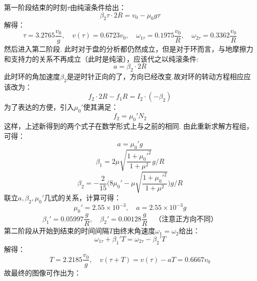 \documentclass{ctexart}
\begin{document}
第一阶段结束的时刻$\tau$由纯滚条件给出：
\begin{equation}
    \beta_2 \tau\cdot 2R=v_0-\mu_0 g\tau \tag{3.16}
\end{equation}
解得：
\begin{equation}
    \tau=3.2765\frac{v_0}{g},\quad v(\tau)=0.6723v_0,\quad \omega_{1\tau}=0.1975\frac{v_0}{R},\quad \omega_{2\tau}=0.3362\frac{v_0}{R} \tag{3.17}
\end{equation}
然后进入第二阶段. 此时对于盘的分析都仍然成立，但是对于环而言，与地摩擦力和支持力的关系不再成立（此时是纯滚），应该代之以纯滚条件:
\begin{equation}
    a=\beta_2\cdot 2R \tag{3.18}
\end{equation}
此时环的角加速度$\beta_2$是逆时针正向的了，方向已经改变.故对环的转动方程相应应该改为：
\begin{equation}
    f_2\cdot 2R-f_1R=I_2\cdot (-\beta_2) \tag{3.19}
\end{equation}
为了表达的方便，引入$\mu_0'$使其满足：
\begin{equation}
f_2=\mu_0'N_2 \tag{3.20}
\end{equation}
这样，上述新得到的两个式子在数学形式上与之前的相同. 由此重新求解方程组，可得：
\begin{equation}
    a=\mu_0' g \tag{3.21}
\end{equation}
\begin{equation}
  \beta_1=2\mu\sqrt{\frac{1+\mu_0'^2}{1+\mu^2}}g/R \tag{3.22}
  \end{equation}
  \begin{equation}
  \beta_2=-\frac{2}{15}\Big(8\mu_0'-\mu \sqrt{\frac{1+\mu_0'^2}{1+\mu^2}}\Big)g/R \tag{3.23}
  \end{equation}
联立$a,\beta_2,\mu_0'$几式的关系，计算可得：
\begin{equation}
    \mu_0'=2.55\times 10^{-3},\quad a=2.55\times 10^{-3}g \tag{3.24}
\end{equation}
\begin{equation}
    \beta_1'=0.05997\frac{g}{R},\quad \beta_2'=0.00128\frac{g}{R}\quad \text{（注意正方向不同）} \tag{3.25}
\end{equation}
第二阶段从开始到结束的时间间隔$T$由终末角速度$\omega_1=\omega_2$给出：
\begin{equation}
    \omega_{1\tau}+\beta_1' T=\omega_{2\tau}-\beta_2' T \tag{3.26}
\end{equation}
解得：
\begin{equation}
    T=2.2185\frac{v_0}{g},\quad v(\tau+T)=v(\tau)-aT=0.6667v_0 \tag{3.27}
\end{equation}
故最终的图像可作出为：
\end{document}
